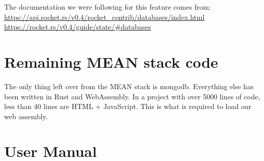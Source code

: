 \documentclass[letterpaper]{article}
\begin{document}
The documentation we were following for this feature comes from:
\url{https://api.rocket.rs/v0.4/rocket\_contrib/databases/index.html}
\url{https://rocket.rs/v0.4/guide/state/#databases}

\section{Remaining MEAN stack code}
The only thing left over from the MEAN stack is mongodb. Everything
else has been written in Rust and WebAssembly. In a project with over
5000 lines of code, less than 40 lines are HTML + JavaScript. This is
what is required to load our web assembly.


\section{User Manual}
\end{document}
